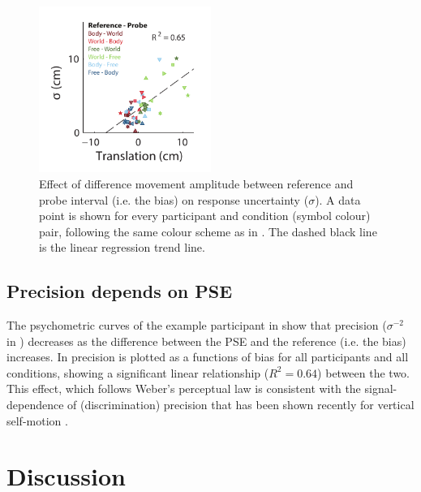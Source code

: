 \begin{figure}
    \includegraphics[width=0.5\textwidth]{src/paper3/figure5.pdf}

    \caption{Effect of difference movement amplitude between reference and probe interval (i.e. the bias) on response uncertainty ($\sigma$). A data point is shown for every participant and condition (symbol colour) pair, following the same colour scheme as in . The dashed black line is the linear regression trend line.}

    \label{p3:fig5}
\end{figure}

\subsection{Precision depends on PSE}
\label{p3:sec:precision}

The psychometric curves of the example participant in  show that precision ($\sigma^{-2}$ in ) decreases as the difference between the PSE and the reference (i.e. the bias) increases. In  precision is plotted as a functions of bias for all participants and all conditions, showing a significant linear relationship ($R^2 = 0.64$) between the two. This effect, which follows Weber's perceptual law \cite{fechner1860} is consistent with the signal-dependence of (discrimination) precision that has been shown recently for vertical self-motion \cite{nesti2014}.



\section{Discussion}

